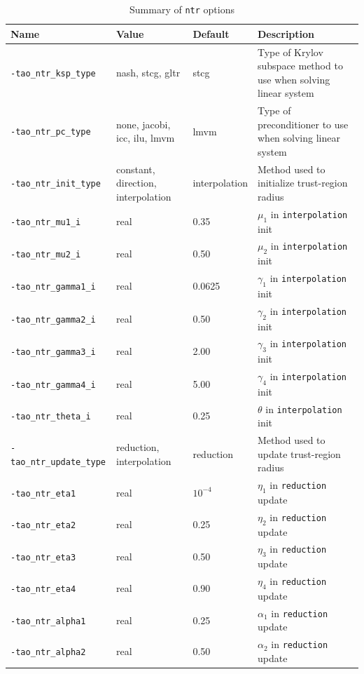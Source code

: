 \begin{table}[h]
\caption{Summary of {\tt ntr} options}
\label{table:ntroptions}
\vspace{5mm}
\begin{tabular}{l|p{1.5in}|l|p{2.0in}}
\hline
Name \rule{0pt}{2.6ex} & Value & Default & Description \\
\hline
{\tt -tao\_ntr\_ksp\_type} \rule{0pt}{2.6ex} & nash, stcg, gltr & stcg & Type of Krylov subspace method to use when solving linear system \\
{\tt -tao\_ntr\_pc\_type} & none, jacobi, icc, ilu, lmvm & lmvm & Type of preconditioner to use when solving linear system \\
{\tt -tao\_ntr\_init\_type} & constant, direction, interpolation &
interpolation & Method used to initialize trust-region radius \\
{\tt -tao\_ntr\_mu1\_i} & real & 0.35 & $\mu_1$ in {\tt interpolation} init \\
{\tt -tao\_ntr\_mu2\_i} & real & 0.50 & $\mu_2$ in {\tt interpolation} init \\
{\tt -tao\_ntr\_gamma1\_i} & real & 0.0625 & $\gamma_1$ in {\tt interpolation} init \\
{\tt -tao\_ntr\_gamma2\_i} & real & 0.50 & $\gamma_2$ in {\tt interpolation} init \\
{\tt -tao\_ntr\_gamma3\_i} & real & 2.00 & $\gamma_3$ in {\tt interpolation} init \\
{\tt -tao\_ntr\_gamma4\_i} & real & 5.00 & $\gamma_4$ in {\tt interpolation} init \\
{\tt -tao\_ntr\_theta\_i} & real & 0.25 & $\theta$ in {\tt interpolation} init \\
{\tt -tao\_ntr\_update\_type} & reduction, interpolation & reduction &
Method used to update trust-region radius \\
{\tt -tao\_ntr\_eta1} & real & $10^{-4}$ & $\eta_1$ in {\tt reduction} update \\
{\tt -tao\_ntr\_eta2} & real & 0.25 & $\eta_2$ in {\tt reduction} update \\
{\tt -tao\_ntr\_eta3} & real & 0.50 & $\eta_3$ in {\tt reduction} update \\
{\tt -tao\_ntr\_eta4} & real & 0.90 & $\eta_4$ in {\tt reduction} update \\
{\tt -tao\_ntr\_alpha1} & real & 0.25 & $\alpha_1$ in {\tt reduction} update \\
{\tt -tao\_ntr\_alpha2} & real & 0.50 & $\alpha_2$ in {\tt reduction} update \\

\end{tabular}
\end{table}
